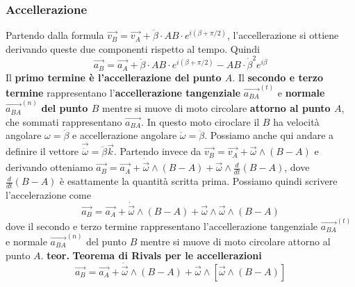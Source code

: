 \subsubsection{Accellerazione}
Partendo dalla formula $\vec{v_B} = \vec{v_A} + \dot{\beta} \cdot AB \cdot e^{i(\beta + \pi/2)}$, l'accellerazione si ottiene derivando queste due componenti rispetto al tempo.\newline
Quindi
\[
    \vec{a_B} = \vec{a_A} + \ddot{\beta} \cdot AB \cdot e^{i(\beta+\pi/2)}-AB \cdot \dot{\beta}^2 e^{i \beta}
\]
Il \textbf{primo termine è l'accellerazione del punto $A$}. Il \textbf{secondo e terzo termine} rappresentano l'\textbf{accellerazione tangenziale} $\vec{a_{BA}}^{(t)}$ e \textbf{normale} $\vec{a_{BA}}^{(n)}$ \textbf{del punto $B$} mentre si muove di moto circolare \textbf{attorno al punto $A$}, che sommati rappresentano $\vec{a_{BA}}$. In questo moto ciroclare il $B$ ha velocità angolare $\omega = \dot{\beta}$ e accellerazione angolare $\dot{\omega} = \ddot{\beta}$. Possiamo anche qui andare a definire il vettore $\vec{\dot{\omega}} = \ddot{\beta}\vec{k}$.\newline
\newline
Partendo invece da $\vec{v_B} = \vec{v_A} + \vec{\omega}\land(B-A)$ e derivando otteniamo $\vec{a_B} = \vec{a_A} + \dot{\vec{\omega}}\land (B-A) + \vec{\omega} \land \frac{d}{dt}(B-A)$, dove $\frac{d}{dt}(B-A)$ è esattamente la quantità scritta prima. Possiamo quindi scrivere l'accelerazione come 
\[
    \vec{a_B}= \vec{a_A} + \dot{\vec{\omega}} \land (B-A) + \vec{\omega} \land \vec{\omega} \land (B-A)
\]
dove il secondo e terzo termine rappresentano l'accellerazione tangenziale $\vec{a_{BA}}^{(t)}$ e normale $\vec{a_{BA}}^{(n)}$ del punto $B$ mentre si muove di moto circolare attorno al punto $A$.\newline
\newline
\textbf{teor.} \textbf{Teorema di Rivals per le accellerazioni}
\[
    \vec{a_B}= \vec{a_A} + \dot{\vec{\omega}} \land (B-A) + \vec{\omega} \land [\vec{\omega} \land (B-A)]
\]